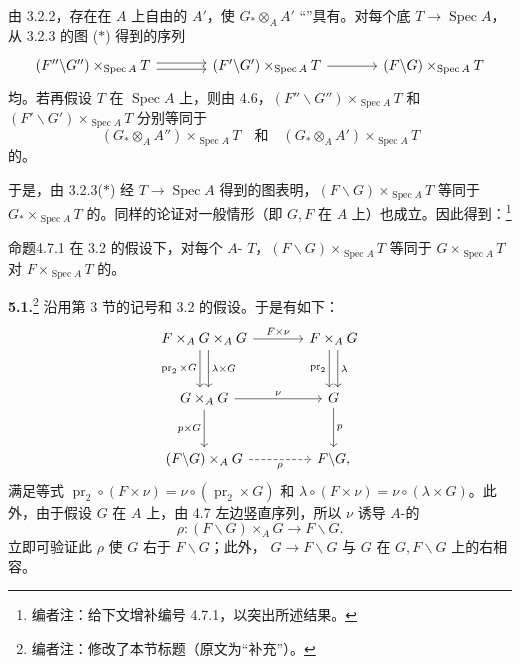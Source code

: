 由 3.2.2，存在在 $A$ 上自由的 $A'$，使 $G_*\otimes_A A'$ “”具有。对每个底 $T\to\operatorname{Spec}A$，从 3.2.3 的图 ($*$) 得到的序列
\[
\begin{tikzcd}[column sep=large]
(F''\backslash G'')\times_{\operatorname{Spec}A}T\arrow[r,shift left=.5ex]\arrow[r,shift right=.5ex]&(F'\backslash G')\times_{\operatorname{Spec}A}T\arrow[r]&(F\backslash G)\times_{\operatorname{Spec}A}T
\end{tikzcd}
\]
均。若再假设 $T$ 在 $\operatorname{Spec}A$ 上，则由 4.6，$(F''\backslash G'')\times_{\operatorname{Spec}A}T$ 和 $(F'\backslash G')\times_{\operatorname{Spec}A}T$ 分别等同于
\[
(G_*\otimes_A A'')\times_{\operatorname{Spec}A}T
\quad\text{和}\quad
(G_*\otimes_A A')\times_{\operatorname{Spec}A}T
\]
的。

于是，由 3.2.3($*$) 经 $T\to\operatorname{Spec}A$ 得到的图表明，$(F\backslash G)\times_{\operatorname{Spec}A}T$ 等同于 $G_*\times_{\operatorname{Spec}A}T$ 的。同样的论证对一般情形（即 $G,F$ 在 $A$ 上）也成立。因此得到：\footnote{编者注：给下文增补编号 4.7.1，以突出所述结果。}
\begin{SGAresult}{命题}{4.7.1}
在 3.2 的假设下，对每个 $A$- $T$，$(F\backslash G)\times_{\operatorname{Spec}A}T$ 等同于 $G\times_{\operatorname{Spec}A}T$ 对 $F\times_{\operatorname{Spec}A}T$ 的。
\end{SGAresult}

\textbf{5.1.}\footnote{编者注：修改了本节标题（原文为“补充”）。} 沿用第 3 节的记号和 3.2 的假设。于是有如下：
\[
\begin{tikzcd}[column sep=large,row sep=large]
F\times_A G\times_A G\arrow[r,"F\times\nu"]\arrow[d,shift left=.7ex,"\lambda\times G"]\arrow[d,shift right=.7ex,"\operatorname{pr}_2\times G"']&F\times_A G\arrow[d,shift left=.7ex,"\lambda"]\arrow[d,shift right=.7ex,"\operatorname{pr}_2"']\\
G\times_A G\arrow[r,"\nu"]\arrow[d,"p\times G"']&G\arrow[d,"p"]\\
(F\backslash G)\times_A G\arrow[r,dashed,"\rho"']&F\backslash G,
\end{tikzcd}
\]
满足等式 $\operatorname{pr}_2\circ(F\times\nu)=\nu\circ(\operatorname{pr}_2\times G)$ 和 $\lambda\circ(F\times\nu)=\nu\circ(\lambda\times G)$。此外，由于假设 $G$ 在 $A$ 上，由 4.7 左边竖直序列，所以 $\nu$ 诱导 $A$-的
\[
\rho:(F\backslash G)\times_A G\longrightarrow F\backslash G.
\]
立即可验证此 $\rho$ 使 $G$ 右于 $F\backslash G$；此外， $G\to F\backslash G$ 与 $G$ 在 $G,F\backslash G$ 上的右相容。


